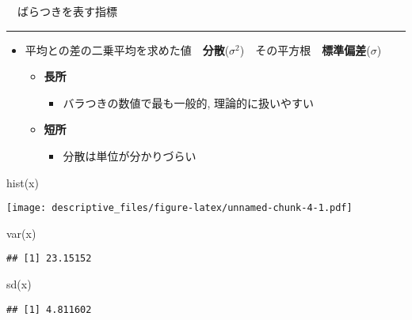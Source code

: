 \documentclass[
]{article}
\newenvironment{Shaded}{\begin{snugshade}}{\end{snugshade}}
\newcommand{\FunctionTok}[1]{\textcolor[rgb]{0.00,0.00,0.00}{#1}}
\newcommand{\NormalTok}[1]{#1}
\providecommand{\tightlist}{%
  \setlength{\itemsep}{0pt}\setlength{\parskip}{0pt}}
\begin{document}
　ばらつきを表す指標

\begin{center}\rule{0.5\linewidth}{0.5pt}\end{center}

\begin{itemize}
\item
  平均との差の二乗平均を求めた値　\textbf{分散}(\(\sigma^2\))　その平方根　\textbf{標準偏差}(\(\sigma\))

  \begin{itemize}
  \tightlist
  \item
    \textbf{長所}

    \begin{itemize}
    \tightlist
    \item
      バラつきの数値で最も一般的, 理論的に扱いやすい
    \end{itemize}
  \item
    \textbf{短所}

    \begin{itemize}
    \tightlist
    \item
      分散は単位が分かりづらい
    \end{itemize}
  \end{itemize}
\end{itemize}

\begin{Shaded}
\begin{Highlighting}[]
\FunctionTok{hist}\NormalTok{(x)}
\end{Highlighting}
\end{Shaded}

\texttt{[image: descriptive\_files/figure-latex/unnamed-chunk-4-1.pdf]}

\begin{Shaded}
\begin{Highlighting}[]
\FunctionTok{var}\NormalTok{(x)}
\end{Highlighting}
\end{Shaded}

\begin{verbatim}
## [1] 23.15152
\end{verbatim}

\begin{Shaded}
\begin{Highlighting}[]
\FunctionTok{sd}\NormalTok{(x)}
\end{Highlighting}
\end{Shaded}

\begin{verbatim}
## [1] 4.811602
\end{verbatim}
\end{document}
